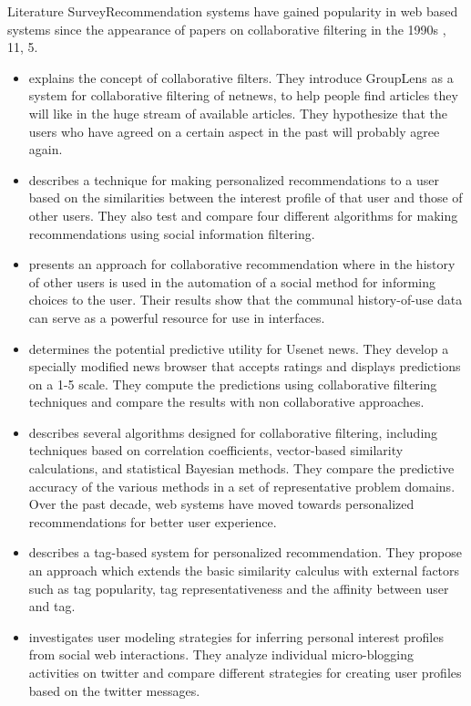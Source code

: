 \documentclass{report}
\begin{document}
\begin{projChapter}{Literature Survey}Recommendation systems have gained popularity in web based systems since the appearance of papers on collaborative filtering in the 1990s , 11, 5\rbrack.
\begin{itemize}
  \item  {}\rbrack explains the concept of collaborative filters. They introduce GroupLens as a system for collaborative filtering of netnews, to help people find articles they will like in the huge stream of available articles. They hypothesize that the users who have agreed on a certain aspect in the past will probably agree again.
  \item  {}\rbrack describes a technique for making personalized recommendations to a user based on the similarities between the interest profile of that user and those of other users. They also test and compare four different algorithms for making recommendations using social information filtering.
  \item  {}\rbrack presents an approach for collaborative recommendation where in the history of other users is used in the automation of a social method for informing choices to the user. Their results show that the communal history-of-use data can serve as a powerful resource for use in interfaces.
  \item  {}\rbrack determines the potential predictive utility for Usenet news. They develop a specially modified news browser that accepts ratings and displays predictions on a 1-5 scale. They compute the predictions using collaborative filtering techniques and compare the results with non collaborative approaches.
  \item  {}\rbrack describes several algorithms designed for collaborative filtering, including techniques based on correlation coefficients, vector-based similarity calculations, and statistical Bayesian methods. They compare the predictive accuracy of the various methods in a set of representative problem domains. Over the past decade, web systems have moved towards personalized recommendations for better user experience.
  \item  {}\rbrack describes a tag-based system for personalized recommendation. They propose an approach which extends the basic similarity calculus with external factors such as tag popularity, tag representativeness and the affinity between user and tag.
  \item  {}\rbrack investigates user modeling strategies for inferring personal interest profiles from social web interactions. They analyze individual micro-blogging activities on twitter and compare different strategies for creating user profiles based on the twitter messages.

\end{itemize}
\end{projChapter}
\end{document}
